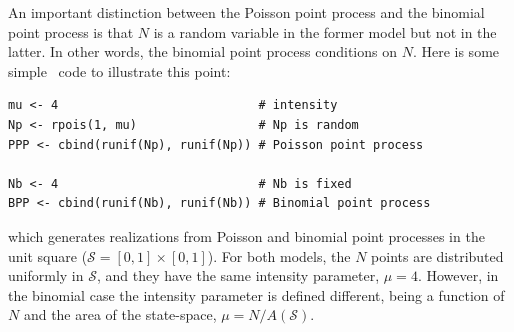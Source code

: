 An important distinction between the Poisson point process and the
binomial point process is that $N$ is a random variable in the former
model but not in
the latter. In other words, the binomial point process conditions on $N$.
Here is some simple \R~code to illustrate this point:
\begin{verbatim}
mu <- 4                            # intensity
Np <- rpois(1, mu)                 # Np is random
PPP <- cbind(runif(Np), runif(Np)) # Poisson point process

Nb <- 4                            # Nb is fixed
BPP <- cbind(runif(Nb), runif(Nb)) # Binomial point process
\end{verbatim}
which generates realizations from Poisson and binomial point
processes in the unit square ($\mathcal{S} = [0,1]\times[0,1]$).
For both models, the $N$ points are
distributed uniformly
in $\mathcal{S}$, and they have the same intensity parameter,
$\mu=4$. However, in the binomial case the intensity parameter is
defined different, being a function of $N$ and the area of the
state-space, $\mu = N/A(\mathcal{S})$.

